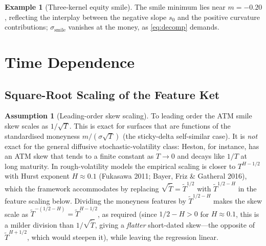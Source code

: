 \documentclass[11pt]{book}
\theoremstyle{plain}
\theoremstyle{definition}
\newtheorem{example}[theorem]{Example}
\newtheorem{assumption}[theorem]{Assumption}
\theoremstyle{remark}
\newcommand{\mln}{m}                             %
\newcommand{\lF}{\ell_F}                         %
\newcommand{\ssm}{\sigma_{\mathrm{smile}}}       %
\newcommand{\satm}{\sigma_{\mathrm{ATM}}}        %
\begin{document}
\begin{example}[Three-kernel equity smile]
\noindent The smile minimum lies near $\mln = -0.20$, reflecting the interplay
between the negative slope $s_0$ and the positive curvature contributions;
$\ssm$ vanishes at the money, as \eqref{eq:decomp} demands.

\begin{center}
\end{center}
\end{example}

\section{Time Dependence}
\label{sec:time}

\subsection{Square-Root Scaling of the Feature Ket}
\label{sec:sqrt-scaling}

\begin{assumption}[Leading-order skew scaling]\label{ass:scaling}
To leading order the ATM smile skew scales as $1/\sqrt{T}$. This is exact for
surfaces that are functions of the standardised moneyness $\mln/(\sigma\sqrt{T})$
(the sticky-delta self-similar case). It is \emph{not} exact for the general diffusive
stochastic-volatility class: Heston, for instance, has an ATM skew that tends to
a finite constant as $T\to0$ and decays like $1/T$ at long maturity. In
rough-volatility models the empirical scaling is closer to $T^{H-1/2}$ with
Hurst exponent $H\approx 0.1$ (Fukasawa 2011; Bayer, Friz \& Gatheral 2016),
which the framework accommodates by replacing
$\sqrt{\tilde T}=\tilde T^{1/2}$ with $\tilde T^{1/2-H}$ in the feature scaling
below. Dividing the moneyness features by $\tilde T^{1/2-H}$ makes the skew
scale as $\tilde T^{-(1/2-H)}=\tilde T^{H-1/2}$, as required (since $1/2-H>0$ for
$H\approx0.1$, this is a milder division than $1/\sqrt{\tilde T}$, giving a
\emph{flatter} short-dated skew---the opposite of $\tilde T^{H+1/2}$, which
would steepen it), while leaving the regression linear.
\end{assumption}
\end{document}
